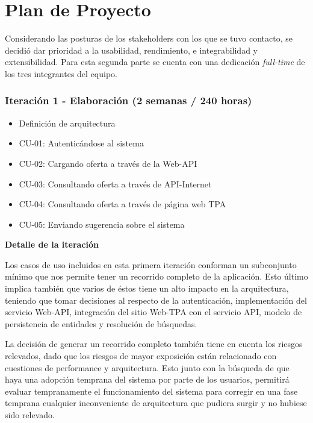 \section*{Plan de Proyecto}

Considerando las posturas de los stakeholders con los que se tuvo contacto, se decidi\'o dar prioridad a la usabilidad, rendimiento, e integrabilidad y extensibilidad. Para esta segunda parte se cuenta con una dedicaci\'on \textit{full-time} de los tres integrantes del equipo.

\subsubsection{Iteraci\'on 1 - Elaboraci\'on (2 semanas / 240 horas)}	
	
	\begin{itemize}
		  \item Definici\'on de arquitectura
		  \item CU-01: Autentic\'andose al sistema
		  \item CU-02: Cargando oferta a trav\'es de la Web-API
		  \item CU-03: Consultando oferta a trav\'es de API-Internet
		  \item CU-04: Consultando oferta a trav\'es de p\'agina web TPA
		  \item CU-05: Enviando sugerencia sobre el sistema
	\end{itemize}

\textbf{Detalle de la iteraci\'on}

	Los casos de uso incluidos en esta primera iteraci\'on conforman un subconjunto m\'inimo que nos permite tener un recorrido completo de la aplicaci\'on. Esto \'ultimo implica tambi\'en que varios de \'estos tiene un alto impacto en la arquitectura, teniendo que tomar decisiones al respecto de la autenticaci\'on, implementaci\'on del servicio Web-API, integraci\'on del sitio Web-TPA con el servicio API, modelo de persistencia de entidades y resoluci\'on de b\'usquedas.
	
	La decisi\'on de generar un recorrido completo tambi\'en tiene en cuenta los riesgos relevados, dado que los riesgos de mayor exposici\'on est\'an relacionado con cuestiones de performance y arquitectura. Esto junto con la b\'usqueda de que haya una  adopci\'on temprana del sistema por parte de los usuarios, permitir\'a evaluar tempranamente el funcionamiento del sistema para corregir en una fase temprana cualquier inconveniente de arquitectura que pudiera surgir y no hubiese sido relevado.
	
